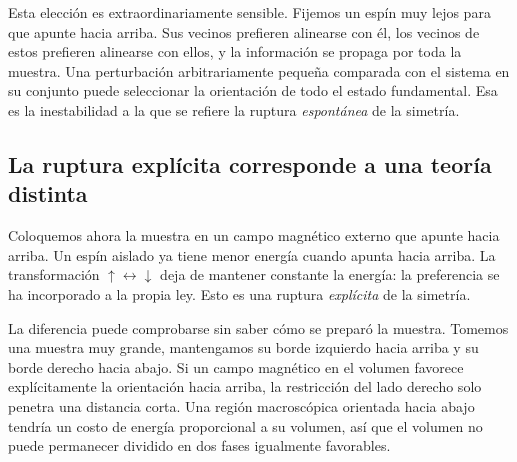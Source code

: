 Esta elección es extraordinariamente sensible. Fijemos un espín muy lejos para que apunte hacia arriba. Sus vecinos prefieren alinearse con él, los vecinos de estos prefieren alinearse con ellos, y la información se propaga por toda la muestra. Una perturbación arbitrariamente pequeña comparada con el sistema en su conjunto puede seleccionar la orientación de todo el estado fundamental. Esa es la inestabilidad a la que se refiere la ruptura \emph{espontánea} de la simetría.

\begin{classroomqa}
\end{classroomqa}

\begin{classroomqa}
\end{classroomqa}

\subsection{La ruptura explícita corresponde a una teoría distinta}

Coloquemos ahora la muestra en un campo magnético externo que apunte hacia arriba. Un espín aislado ya tiene menor energía cuando apunta hacia arriba. La transformación \(\uparrow\leftrightarrow\downarrow\) deja de mantener constante la energía: la preferencia se ha incorporado a la propia ley. Esto es una ruptura \emph{explícita} de la simetría.

La diferencia puede comprobarse sin saber cómo se preparó la muestra. Tomemos una muestra muy grande, mantengamos su borde izquierdo hacia arriba y su borde derecho hacia abajo. Si un campo magnético en el volumen favorece explícitamente la orientación hacia arriba, la restricción del lado derecho solo penetra una distancia corta. Una región macroscópica orientada hacia abajo tendría un costo de energía proporcional a su volumen, así que el volumen no puede permanecer dividido en dos fases igualmente favorables.


